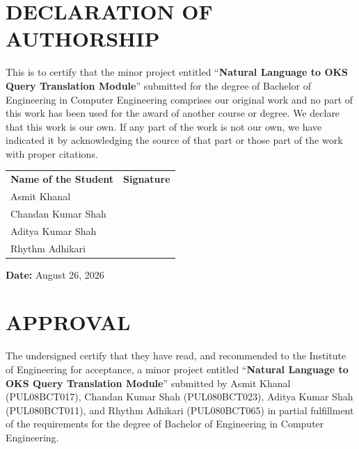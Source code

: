\documentclass[12pt, a4paper]{report}
\begin{document}
\chapter*{DECLARATION OF AUTHORSHIP}

This is to certify that the minor project entitled ``\textbf{Natural Language to OKS Query Translation Module}'' submitted for the degree of Bachelor of Engineering in Computer Engineering comprises our original work and no part of this work has been used for the award of another course or degree. We declare that this work is our own. If any part of the work is not our own, we have indicated it by acknowledging the source of that part or those part of the work with proper citations.

\vspace{1.5cm}
\noindent
\begin{tabular}{@{}p{8cm} p{6cm}@{}}
\textbf{Name of the Student} & \textbf{Signature} \\[1cm]
Asmit Khanal & \hrulefill \\[1cm]
Chandan Kumar Shah & \hrulefill \\[1cm]
Aditya Kumar Shah & \hrulefill \\[1cm]
Rhythm Adhikari & \hrulefill \\[1cm]
\end{tabular}

\vspace{1cm}
\noindent \textbf{Date:} August 26, 2026
\newpage

\chapter*{APPROVAL}

The undersigned certify that they have read, and recommended to the Institute of Engineering for acceptance, a minor project entitled ``\textbf{Natural Language to OKS Query Translation Module}'' submitted by Asmit Khanal (PUL08BCT017), Chandan Kumar Shah (PUL080BCT023), Aditya Kumar Shah (PUL080BCT011), and Rhythm Adhikari (PUL080BCT065) in partial fulfillment of the requirements for the degree of Bachelor of Engineering in Computer Engineering.
\end{document}
